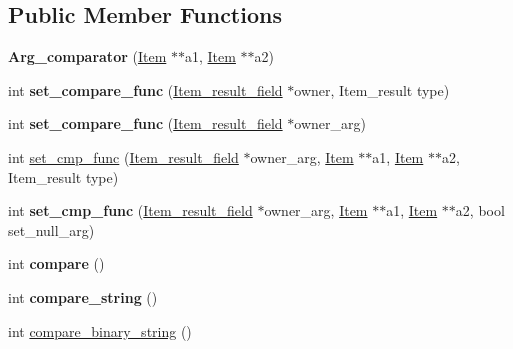 \subsection*{Public Member Functions}
\begin{DoxyCompactItemize}
\item 
\mbox{\label{classArg__comparator_a7158515094a23d5d648f23e2b901b1c4}} 
{\bfseries Arg\+\_\+comparator} (\mbox{\hyperlink{classItem}{Item}} $\ast$$\ast$a1, \mbox{\hyperlink{classItem}{Item}} $\ast$$\ast$a2)
\item 
\mbox{\label{classArg__comparator_a67b92b82706e5ff84a23782744a5cea9}} 
int {\bfseries set\+\_\+compare\+\_\+func} (\mbox{\hyperlink{classItem__result__field}{Item\+\_\+result\+\_\+field}} $\ast$owner, Item\+\_\+result type)
\item 
\mbox{\label{classArg__comparator_a0a821d25c6afda3c21861e683e5eac55}} 
int {\bfseries set\+\_\+compare\+\_\+func} (\mbox{\hyperlink{classItem__result__field}{Item\+\_\+result\+\_\+field}} $\ast$owner\+\_\+arg)
\item 
int \mbox{\hyperlink{classArg__comparator_aafa1b31ab84277b8cd2d4c798b0147e3}{set\+\_\+cmp\+\_\+func}} (\mbox{\hyperlink{classItem__result__field}{Item\+\_\+result\+\_\+field}} $\ast$owner\+\_\+arg, \mbox{\hyperlink{classItem}{Item}} $\ast$$\ast$a1, \mbox{\hyperlink{classItem}{Item}} $\ast$$\ast$a2, Item\+\_\+result type)
\item 
\mbox{\label{classArg__comparator_a1f1908dcc80c983e18cab787fa578f25}} 
int {\bfseries set\+\_\+cmp\+\_\+func} (\mbox{\hyperlink{classItem__result__field}{Item\+\_\+result\+\_\+field}} $\ast$owner\+\_\+arg, \mbox{\hyperlink{classItem}{Item}} $\ast$$\ast$a1, \mbox{\hyperlink{classItem}{Item}} $\ast$$\ast$a2, bool set\+\_\+null\+\_\+arg)
\item 
\mbox{\label{classArg__comparator_a9e24c372202a866adce1271aa3786f51}} 
int {\bfseries compare} ()
\item 
\mbox{\label{classArg__comparator_ae951bb9a5293e9baedf669c58ac3a159}} 
int {\bfseries compare\+\_\+string} ()
\item 
int \mbox{\hyperlink{classArg__comparator_aa8cea3edea51ae9420d15fef60903ab0}{compare\+\_\+binary\+\_\+string}} ()

\end{DoxyCompactItemize}
